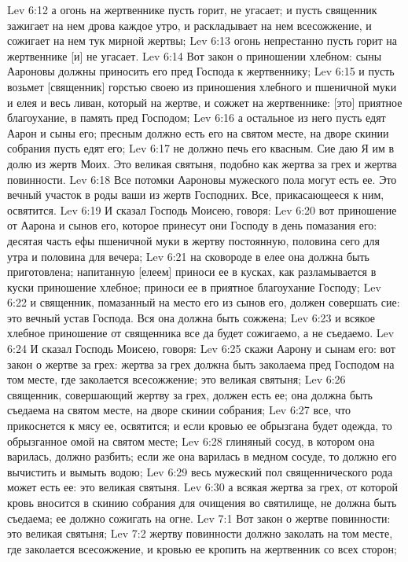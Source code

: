 Lev 6:12  а огонь на жертвеннике пусть горит, не угасает; и пусть священник зажигает на нем дрова каждое утро, и раскладывает на нем всесожжение, и сожигает на нем тук мирной жертвы;
Lev 6:13  огонь непрестанно пусть горит на жертвеннике [и] не угасает.
Lev 6:14  Вот закон о приношении хлебном: сыны Аароновы должны приносить его пред Господа к жертвеннику;
Lev 6:15  и пусть возьмет [священник] горстью своею из приношения хлебного и пшеничной муки и елея и весь ливан, который на жертве, и сожжет на жертвеннике: [это] приятное благоухание, в память пред Господом;
Lev 6:16  а остальное из него пусть едят Аарон и сыны его; пресным должно есть его на святом месте, на дворе скинии собрания пусть едят его;
Lev 6:17  не должно печь его квасным. Сие даю Я им в долю из жертв Моих. Это великая святыня, подобно как жертва за грех и жертва повинности.
Lev 6:18  Все потомки Аароновы мужеского пола могут есть ее. Это вечный участок в роды ваши из жертв Господних. Все, прикасающееся к ним, освятится.
Lev 6:19  И сказал Господь Моисею, говоря:
Lev 6:20  вот приношение от Аарона и сынов его, которое принесут они Господу в день помазания его: десятая часть ефы пшеничной муки в жертву постоянную, половина сего для утра и половина для вечера;
Lev 6:21  на сковороде в елее она должна быть приготовлена; напитанную [елеем] приноси ее в кусках, как разламывается в куски приношение хлебное; приноси ее в приятное благоухание Господу;
Lev 6:22  и священник, помазанный на место его из сынов его, должен совершать сие: это вечный устав Господа. Вся она должна быть сожжена;
Lev 6:23  и всякое хлебное приношение от священника все да будет сожигаемо, а не съедаемо.
Lev 6:24  И сказал Господь Моисею, говоря:
Lev 6:25  скажи Аарону и сынам его: вот закон о жертве за грех: жертва за грех должна быть заколаема пред Господом на том месте, где заколается всесожжение; это великая святыня;
Lev 6:26  священник, совершающий жертву за грех, должен есть ее; она должна быть съедаема на святом месте, на дворе скинии собрания;
Lev 6:27  все, что прикоснется к мясу ее, освятится; и если кровью ее обрызгана будет одежда, то обрызганное омой на святом месте;
Lev 6:28  глиняный сосуд, в котором она варилась, должно разбить; если же она варилась в медном сосуде, то должно его вычистить и вымыть водою;
Lev 6:29  весь мужеский пол священнического рода может есть ее: это великая святыня.
Lev 6:30  а всякая жертва за грех, от которой кровь вносится в скинию собрания для очищения во святилище, не должна быть съедаема; ее должно сожигать на огне.
Lev 7:1  Вот закон о жертве повинности: это великая святыня;
Lev 7:2  жертву повинности должно заколать на том месте, где заколается всесожжение, и кровью ее кропить на жертвенник со всех сторон;
